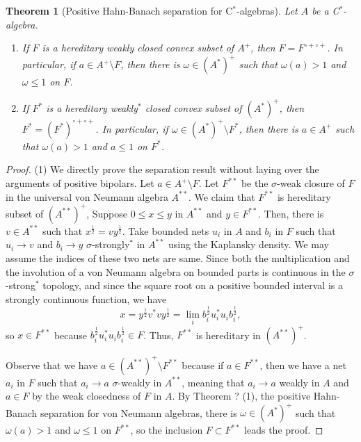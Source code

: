 \documentclass[a4paper]{amsart}
\theoremstyle{plain}
\newtheorem{thm}{Theorem}[section]
\theoremstyle{definition}
\begin{document}
\begin{thm}[Positive Hahn-Banach separation for C$^*$-algebras]
Let $A$ be a C$^*$-algebra.
\begin{enumerate}
\item If $F$ is a hereditary weakly closed convex subset of $A^+$, then $F=F^{\circ+\circ+}$. In particular, if $a\in A^+\setminus F$, then there is $\omega\in(A^*)^+$ such that $\omega(a)>1$ and $\omega\le1$ on $F$.
\item If $F^*$ is a hereditary weakly$^*$ closed convex subset of $(A^*)^+$, then $F^*=(F^*)^{\circ+\circ+}$. In particular, if $\omega\in(A^*)^+\setminus F^*$, then there is $a\in A^+$ such that $\omega(a)>1$ and $a\le1$ on $F^*$.
\end{enumerate}
\end{thm}
\begin{proof}
(1)
We directly prove the separation result without laying over the arguments of positive bipolars.
Let $a\in A^+\setminus F$.
Let $F^{**}$ be the $\sigma$-weak closure of $F$ in the universal von Neumann algebra $A^{**}$.
We claim that $F^{**}$ is hereditary subset of $(A^{**})^+$,
Suppose $0\le x\le y$ in $A^{**}$ and $y\in F^{**}$.
Then, there is $v\in A^{**}$ such that $x^{\frac12}=vy^{\frac12}$.
Take bounded nets $u_i$ in $A$ and $b_i$ in $F$ such that $u_i\to v$ and $b_i\to y$ $\sigma$-strongly$^*$ in $A^{**}$ using the Kaplansky density.
We may assume the indices of these two nets are same.
Since both the multiplication and the involution of a von Neumann algebra on bounded parts is continuous in the $\sigma$-strong$^*$ topology, and since the square root on a positive bounded interval is a strongly continuous function, we have
\[x=y^{\frac12}v^*vy^{\frac12}=\lim_ib_i^{\frac12}u_i^*u_ib_i^{\frac12},\]
so $x\in F^{**}$ because $b_i^{\frac12}u_i^*u_ib_i^{\frac12}\in F$.
Thus, $F^{**}$ is hereditary in $(A^{**})^+$.

Observe that we have $a\in(A^{**})^+\setminus F^{**}$ because if $a\in F^{**}$, then we have a net $a_i$ in $F$ such that $a_i\to a$ $\sigma$-weakly in $A^{**}$, meaning that $a_i\to a$ weakly in $A$ and $a\in F$ by the weak closedness of $F$ in $A$.
By Theorem ? (1), the positive Hahn-Banach separation for von Neumann algebras, there is $\omega\in(A^*)^+$ such that $\omega(a)>1$ and $\omega\le1$ on $F^{**}$, so the inclusion $F\subset F^{**}$ leads the proof.


\end{proof}
\end{document}
